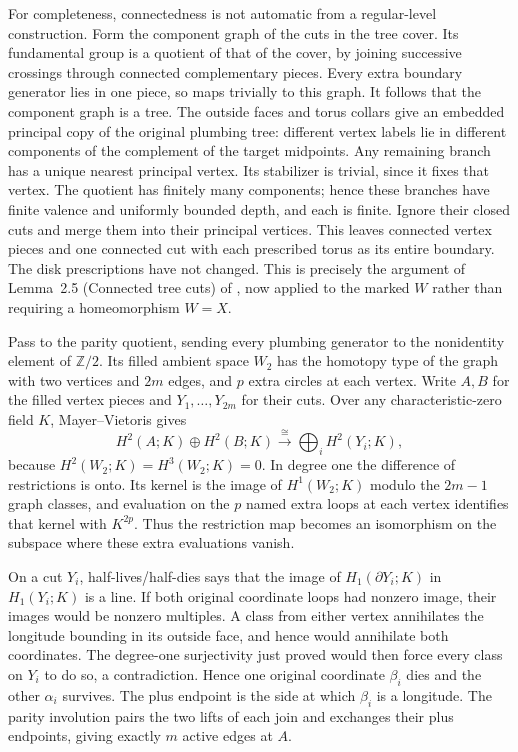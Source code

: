 \documentclass[11pt]{article}
\theoremstyle{definition}
\theoremstyle{remark}
\newcommand{\Z}{\mathbb Z}
\begin{document}
For completeness, connectedness is not automatic from a regular-level
construction.  Form the component graph of the cuts in the tree cover.
Its fundamental group is a quotient of that of the cover, by joining
successive crossings through connected complementary pieces.  Every
extra boundary generator lies in one piece, so maps trivially to this
graph.  It follows that the component graph is a tree.  The outside
faces and torus collars give an embedded principal copy of the original
plumbing tree: different vertex labels lie in different components of
the complement of the target midpoints.  Any remaining branch has a
unique nearest principal vertex.  Its stabilizer is trivial, since it
fixes that vertex.  The quotient has finitely many components; hence
these branches have finite valence and uniformly bounded depth, and
each is finite.  Ignore their closed cuts and merge them into their
principal vertices.  This leaves connected vertex pieces and one
connected cut with each prescribed torus as its entire boundary.
The disk prescriptions have not changed.  This is precisely the
argument of Lemma~2.5 (Connected tree cuts) of \cite{TO}, now
applied to the marked $W$ rather than requiring a homeomorphism $W=X$.

Pass to the parity quotient, sending every plumbing generator to the
nonidentity element of $\Z/2$.  Its filled ambient space $W_2$ has
the homotopy type of the graph with two vertices and $2m$ edges,
and $p$ extra circles at each vertex.  Write $A,B$ for the filled
vertex pieces and $Y_1,\ldots,Y_{2m}$ for their cuts.  Over any
characteristic-zero field $K$, Mayer--Vietoris gives
\begin{equation}
\label{ch:restriction-two}
 H^2(A;K)\oplus H^2(B;K)
       \xrightarrow{\ \cong\ }\bigoplus_iH^2(Y_i;K),
\end{equation}
because $H^2(W_2;K)=H^3(W_2;K)=0$.  In degree one the difference
of restrictions is onto.  Its kernel is the image of $H^1(W_2;K)$
modulo the $2m-1$ graph classes, and evaluation on the $p$ named
extra loops at each vertex identifies that kernel with $K^{2p}$.
Thus the restriction map becomes an isomorphism on the subspace
where these extra evaluations vanish.

On a cut $Y_i$, half-lives/half-dies says that the image of
$H_1(\partial Y_i;K)$ in $H_1(Y_i;K)$ is a line.  If both original
coordinate loops had nonzero image, their images would be nonzero
multiples.  A class from either vertex annihilates the longitude
bounding in its outside face, and hence would annihilate both
coordinates.  The degree-one surjectivity just proved would then
force every class on $Y_i$ to do so, a contradiction.  Hence one
original coordinate $\beta_i$ dies and the other $\alpha_i$ survives.
The plus endpoint is the side at which $\beta_i$ is a longitude.
The parity involution pairs the two lifts of each join and exchanges
their plus endpoints, giving exactly $m$ active edges at $A$.
\end{document}
